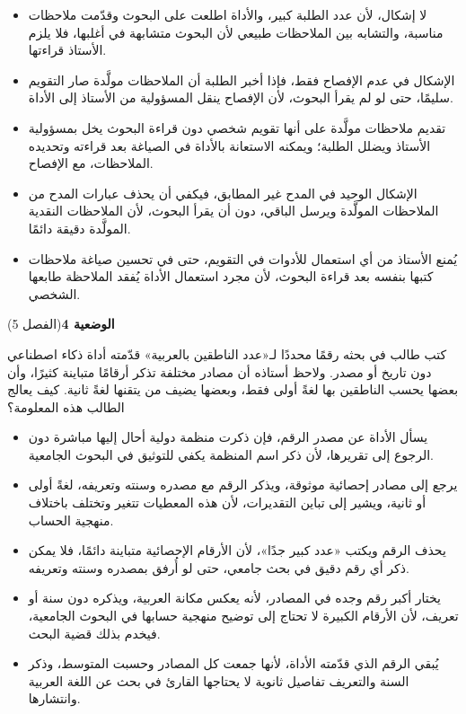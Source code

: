 \documentclass[11pt,a4paper]{article}
\begin{document}
\begin{itemize}[leftmargin=1.0cm, labelsep=6pt, itemsep=3pt, topsep=4pt, parsep=0pt]
  \item[\textbf{أ)}] لا إشكال، لأن عدد الطلبة كبير، والأداة اطلعت على البحوث وقدّمت ملاحظات مناسبة، والتشابه بين الملاحظات طبيعي لأن البحوث متشابهة في أغلبها، فلا يلزم الأستاذ قراءتها.
  \item[\textbf{ب)}] الإشكال في عدم الإفصاح فقط، فإذا أخبر الطلبة أن الملاحظات مولَّدة صار التقويم سليمًا، حتى لو لم يقرأ البحوث، لأن الإفصاح ينقل المسؤولية من الأستاذ إلى الأداة.
  \item[\textbf{ج)}] تقديم ملاحظات مولَّدة على أنها تقويم شخصي دون قراءة البحوث يخل بمسؤولية الأستاذ ويضلل الطلبة؛ ويمكنه الاستعانة بالأداة في الصياغة بعد قراءته وتحديده الملاحظات، مع الإفصاح.
  \item[\textbf{د)}] الإشكال الوحيد في المدح غير المطابق، فيكفي أن يحذف عبارات المدح من الملاحظات المولَّدة ويرسل الباقي، دون أن يقرأ البحوث، لأن الملاحظات النقدية المولَّدة دقيقة دائمًا.
  \item[\textbf{هـ)}] يُمنع الأستاذ من أي استعمال للأدوات في التقويم، حتى في تحسين صياغة ملاحظات كتبها بنفسه بعد قراءة البحوث، لأن مجرد استعمال الأداة يُفقد الملاحظة طابعها الشخصي.
\end{itemize}
\par\vspace{6pt}
\noindent
{\large\khatt\textbf{الوضعية 4}}\hfill{\small(الفصل 5)}\par\nopagebreak\vspace{3pt}
\setlength{\fboxsep}{7pt}\colorbox{gray!10}{\parbox{\dimexpr\linewidth-14pt}{كتب طالب في بحثه رقمًا محددًا لـ«عدد الناطقين بالعربية» قدّمته أداة ذكاء اصطناعي دون تاريخ أو مصدر. ولاحظ أستاذه أن مصادر مختلفة تذكر أرقامًا متباينة كثيرًا، وأن بعضها يحسب الناطقين بها لغةً أولى فقط، وبعضها يضيف من يتقنها لغةً ثانية. كيف يعالج الطالب هذه المعلومة؟}}\par\nopagebreak
\begin{itemize}[leftmargin=1.0cm, labelsep=6pt, itemsep=3pt, topsep=4pt, parsep=0pt]
  \item[\textbf{أ)}] يسأل الأداة عن مصدر الرقم، فإن ذكرت منظمة دولية أحال إليها مباشرة دون الرجوع إلى تقريرها، لأن ذكر اسم المنظمة يكفي للتوثيق في البحوث الجامعية.
  \item[\textbf{ب)}] يرجع إلى مصادر إحصائية موثوقة، ويذكر الرقم مع مصدره وسنته وتعريفه، لغةً أولى أو ثانية، ويشير إلى تباين التقديرات، لأن هذه المعطيات تتغير وتختلف باختلاف منهجية الحساب.
  \item[\textbf{ج)}] يحذف الرقم ويكتب «عدد كبير جدًا»، لأن الأرقام الإحصائية متباينة دائمًا، فلا يمكن ذكر أي رقم دقيق في بحث جامعي، حتى لو أُرفق بمصدره وسنته وتعريفه.
  \item[\textbf{د)}] يختار أكبر رقم وجده في المصادر، لأنه يعكس مكانة العربية، ويذكره دون سنة أو تعريف، لأن الأرقام الكبيرة لا تحتاج إلى توضيح منهجية حسابها في البحوث الجامعية، فيخدم بذلك قضية البحث.
  \item[\textbf{هـ)}] يُبقي الرقم الذي قدّمته الأداة، لأنها جمعت كل المصادر وحسبت المتوسط، وذكر السنة والتعريف تفاصيل ثانوية لا يحتاجها القارئ في بحث عن اللغة العربية وانتشارها.
\end{itemize}
\end{document}
